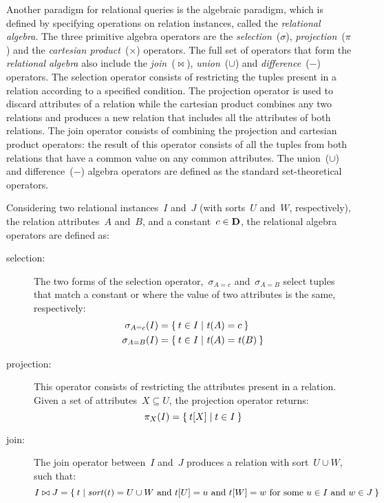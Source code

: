 Another paradigm for relational queries is the algebraic paradigm, which is defined by specifying operations on relation
instances, called the \emph{relational algebra}.
%
The three primitive algebra operators are the \emph{selection}~($\sigma$), \emph{projection}~($\pi$) and the
\emph{cartesian product}~($\times$) operators.
%
The full set of operators that form the \emph{relational algebra} also include the \emph{join}~($\bowtie$),
\emph{union}~($\cup$) and \emph{difference}~($-$) operators.  
%
The selection operator consists of restricting the tuples present in a relation according to a specified condition.
%
The projection operator is used to discard attributes of a relation while the cartesian product combines any two
relations and produces a new relation that includes all the attributes of both relations.
%
The join operator consists of combining the projection and cartesian product operators: the result of this operator
consists of all the tuples from both relations that have a common value on any common attributes. 
%
The union~($\cup$) and difference~($-$) algebra operators are defined as the standard set-theoretical operators.
% 

Considering two relational instances~$I$ and~$J$ (with sorts~$U$ and~$W$, respectively), the relation attributes~$A$
and~$B$, and a constant~$c \in \mathbf{D}$, the relational algebra operators are defined as:
% 
\begin{description}
\item[selection:] The two forms of the selection operator,~$\sigma_{A=c}$ and~$\sigma_{A=B}$ select tuples that match a
  constant or where the value of two attributes is the same, respectively:
  \begin{align*}
    \sigma_{A=c}(I) &= \left\{\: t \in I \mid \mathit{t}\!\left(A\right) = c \:\right\} \\
    \sigma_{A=B}(I) &= \left\{\: t \in I \mid \mathit{t}\!\left(A\right) = \mathit{t}\!\left(B\right) \:\right\}
  \end{align*}
\item[projection:] This operator consists of restricting the attributes present in a relation. Given a set of
  attributes~$X \subseteq U$, the projection operator returns:
  \[
  \pi_{X}(I) = \left\{\: t[X] \mid t \in I \:\right\}
  \]
\item[join:] The join operator between~$I$ and~$J$ produces a relation with sort~$U \cup W$, such that:
  \[
  I \bowtie J = \left\{\: t \mid \mathit{sort}\!\left(t\right) = U \cup W\mbox{ and }t[U] = u\mbox{ and }t[W] = w\mbox{ for some }u \in I\mbox{ and }w \in J \:\right\}
  \]
\end{description}
% 


